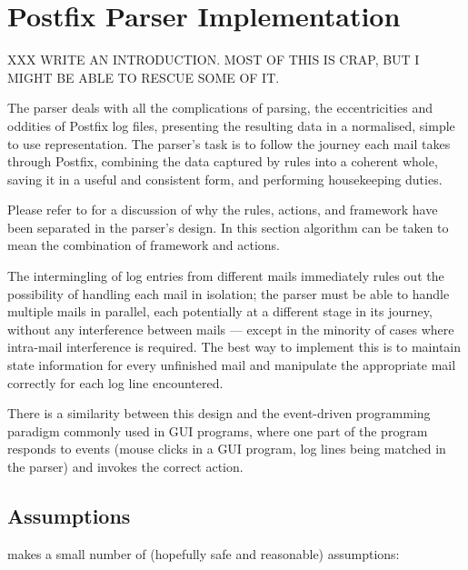 \chapter{Postfix Parser Implementation}

\label{Postfix Parser Implementation}

XXX WRITE AN INTRODUCTION\@.  MOST OF THIS IS CRAP, BUT I MIGHT BE ABLE TO
RESCUE SOME OF IT\@.

The parser deals with all the complications of parsing, the eccentricities
and oddities of Postfix log files, presenting the resulting data in a
normalised, simple to use representation.  The parser's task is to follow
the journey each mail takes through Postfix, combining the data captured by
rules into a coherent whole, saving it in a useful and consistent form, and
performing housekeeping duties.

Please refer to  for a discussion of why the
rules, actions, and framework have been separated in the parser's design.
In this section algorithm can be taken to mean the combination of framework
and actions.

The intermingling of log entries from different mails immediately rules out
the possibility of handling each mail in isolation; the parser must be able
to handle multiple mails in parallel, each potentially at a different stage
in its journey, without any interference between mails --- except in the
minority of cases where intra-mail interference is required.  The best way
to implement this is to maintain state information for every unfinished
mail and manipulate the appropriate mail correctly for each log line
encountered.

There is a similarity between this design and the event-driven programming
paradigm commonly used in GUI programs, where one part of the program
responds to events (mouse clicks in a GUI program, log lines being matched
in the parser) and invokes the correct action.


\section{Assumptions}

\parsername{} makes a small number of (hopefully safe and reasonable)
assumptions:

